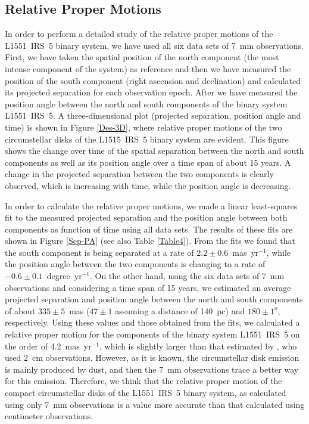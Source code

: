 \documentclass[debug]{rmaa}
\begin{document}
\subsection{Relative Proper Motions}
\label{rpm}
In order to perform a detailed study of the relative proper motions of the L1551~IRS~5
 binary system, we have used all six data sets of 7~mm observations. First,
we have taken the spatial position of the north component (the most intense
component of the system) as reference and then we have measured the position
of the south component (right ascension and declination) and calculated its
projected separation for each observation epoch. After we have measured the
position angle between the north and south components of the binary system 
L1551~IRS~5. 
A three-dimensional plot (projected separation, position angle and time) is
shown in Figure \ref{Des-3D}, where relative proper motions of the two circumstellar
disks of the L1515~IRS~5 binary system are evident. This figure shows the change
over time of the spatial separation between the north and south components
as well as its position angle over a time span of about 15 years. A change in the 
projected separation between the two components is clearly observed, which is increasing
with time, while the position angle is decreasing.


In order to calculate the relative proper motions, we made a linear least-squares
fit to the measured projected separation and the position angle between both components 
as function of time using all data sets. The results of these fits are shown
in Figure \ref{Sep-PA} (see also Table \ref{Table4}). From the fits  we found 
that the south component is being separated at a rate of $2.2\pm0.6$~mas~yr$^{-1}$,
while the position angle between the two components is changing to a rate of
$-0.6\pm0.1$~degree~yr$^{-1}$. On the other hand, using the six data sets of 7~mm 
observations and considering a time span of 15 years, we estimated an average
projected separation and position angle between the north and south components
of about $335\pm 5$~mas ($47 \pm 1$ assuming a distance of 140~pc)
 and $180 \pm 1^{o}$, respectively.
Using these values and those obtained from the fits, we calculated a relative proper
motion for the components  of the binary system L1551~IRS~5  on the order of 
4.2~mas~yr$^{-1}$, which is slightly larger than that estimated by \citet{Rodriguez2003},
who used 2~cm observations. However, as it is known, the circumstellar disk emission is
mainly produced by dust, and then the 7~mm observations trace a better way for this emission.
Therefore, we think that the relative proper motion of the compact circumstellar disks
of the L1551~IRS~5 binary system, as calculated using only 7~mm observations
is a value more accurate than that calculated using centimeter observations.
\end{document}

